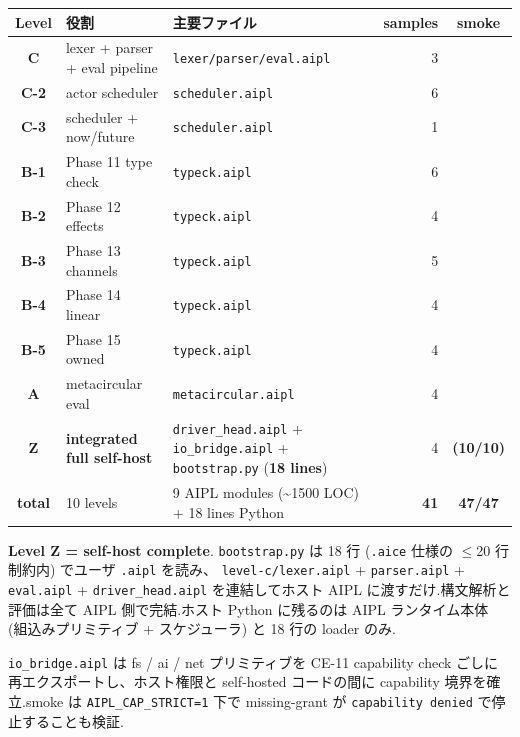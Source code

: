 \documentclass[10pt,a4paper,landscape]{article}
\newcommand{\Yes}{\textcolor{green!50!black}{\textbf{\checkmark}}}
\begin{document}
\begin{center}
\small
\begin{tabular}{cp{4.5cm}p{4cm}rc}
\toprule
\textbf{Level} & \textbf{役割} & \textbf{主要ファイル} & \textbf{samples} & \textbf{smoke} \\
\midrule
\textbf{C}     & lexer + parser + eval pipeline & \texttt{lexer/parser/eval.aipl} & 3  & \Yes \\
\textbf{C-2}   & actor scheduler                 & \texttt{scheduler.aipl}        & 6  & \Yes \\
\textbf{C-3}   & scheduler + now/future          & \texttt{scheduler.aipl}        & 1  & \Yes \\
\textbf{B-1}   & Phase 11 type check             & \texttt{typeck.aipl}           & 6  & \Yes \\
\textbf{B-2}   & Phase 12 effects                & \texttt{typeck.aipl}           & 4  & \Yes \\
\textbf{B-3}   & Phase 13 channels               & \texttt{typeck.aipl}           & 5  & \Yes \\
\textbf{B-4}   & Phase 14 linear                 & \texttt{typeck.aipl}           & 4  & \Yes \\
\textbf{B-5}   & Phase 15 owned                  & \texttt{typeck.aipl}           & 4  & \Yes \\
\textbf{A}     & metacircular eval               & \texttt{metacircular.aipl}     & 4  & \Yes \\
\textbf{Z}     & \textbf{integrated full self-host} & \texttt{driver\_head.aipl} + \texttt{io\_bridge.aipl} + \texttt{bootstrap.py} (\textbf{18 lines}) & 4 & \Yes \textbf{(10/10)} \\
\midrule
\textbf{total} & 10 levels                        & 9 AIPL modules (\textasciitilde 1500 LOC) + 18 lines Python & \textbf{41} & \textbf{47/47} \\
\bottomrule
\end{tabular}
\end{center}

\textbf{Level Z = self-host complete}.  \texttt{bootstrap.py} は 18 行
(\texttt{.aice} 仕様の $\le$20 行制約内) でユーザ \texttt{.aipl} を読み、
\texttt{level-c/lexer.aipl} + \texttt{parser.aipl} + \texttt{eval.aipl} +
\texttt{driver\_head.aipl} を連結してホスト AIPL に渡すだけ.構文解析と
評価は全て AIPL 側で完結.ホスト Python に残るのは AIPL ランタイム本体
(組込みプリミティブ + スケジューラ) と 18 行の loader のみ.

\texttt{io\_bridge.aipl} は fs / ai / net プリミティブを CE-11
capability check ごしに再エクスポートし、ホスト権限と self-hosted
コードの間に capability 境界を確立.smoke は \texttt{AIPL\_CAP\_STRICT=1}
下で missing-grant が \texttt{capability denied} で停止することも検証.
\end{document}
